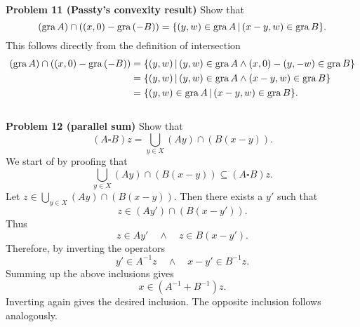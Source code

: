 \documentclass{scrartcl}
\newcommand{\sub}{\subseteq}
\theoremstyle{plain}
\theoremstyle{remark}
\newcommand{\gr}{\textup{gra}\,}
\begin{document}
\textbf{Problem 11 (Passty's convexity result)} Show that
\begin{equation}
  (\gr A) \cap ((x,0) - \gr (-B)) = \{(y,w) \in \gr A \,| \,(x-y,w) \in \gr B\}.
\end{equation}
This follows directly from the definition of intersection
\begin{equation}
  \begin{aligned}
    (\gr A) \cap ((x,0) - \gr (-B)) &= \{(y,w) \,| \,(y,w) \in \gr A \wedge (x,0) - (y,-w) \in \gr B\} \\
    &= \{(y,w) \,| \,(y,w) \in \gr A \wedge (x-y,w) \in \gr B\} \\
    &= \{(y,w) \in \gr A \,| \,(x-y,w) \in \gr B\}.
  \end{aligned}
\end{equation}\\

\textbf{Problem 12 (parallel sum)} Show that
\begin{equation}
  (A \square B)z = \bigcup_{y \in X} (Ay) \cap (B(x-y)).
\end{equation}
We start of by proofing that
\begin{equation}
  \bigcup_{y \in X} (Ay) \cap (B(x-y)) \sub (A \square B)z.
\end{equation}
Let $z \in \bigcup_{y \in X} (Ay) \cap (B(x-y))$.
Then there exists a $y'$ such that
\begin{equation}
  z \in (Ay') \cap (B(x-y')).
\end{equation}
Thus 
\begin{equation}
  z \in A y' \quad \wedge \quad z \in B(x-y').
\end{equation}
Therefore, by inverting the operators
\begin{equation}
  y' \in A^{-1} z \quad \wedge \quad x - y' \in B^{-1}z.
\end{equation}
Summing up the above inclusions gives
\begin{equation}
  x \in (A^{-1} + B^{-1})z.
\end{equation}
Inverting again gives the desired inclusion. The opposite inclusion follows analogously.\\
\end{document}
